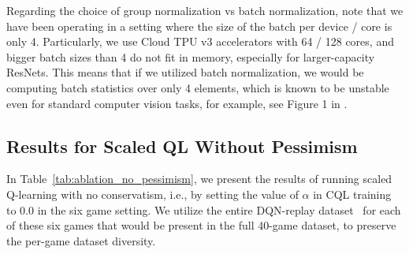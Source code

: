 \begin{table}[h]
    \centering
    \centering
    \vspace{-0.4cm}
    \caption{\footnotesize{{\textbf{Ablations for the backbone architecture in the 40-game setting} with ResNet 101. Observe that learned spatial embeddings leads to around 80\% improvement in performance.}}} %
    \label{tab:ablation_backbone_40_game}
    \vspace{0.25cm}
\end{table}

{Regarding the choice of group normalization vs batch normalization, note that we have been operating in a setting where the size of the batch per device / core is only 4. Particularly, we use Cloud TPU v3 accelerators with 64 / 128 cores, and bigger batch sizes than 4 do not fit in memory, especially for larger-capacity ResNets. This means that if we utilized batch normalization, we would be computing batch statistics over only 4 elements, which is known to be unstable even for standard computer vision tasks, for example, see Figure 1 in \citet{wu2018group}.} 

\vspace{-0.2cm}
\subsection{{{Results for Scaled QL Without Pessimism}}}
\label{app:no_pessimism}
\vspace{-0.2cm}
{In Table~\ref{tab:ablation_no_pessimism}, we present the results of running scaled Q-learning with no conservatism, i.e., by setting the value of $\alpha$ in CQL training to 0.0 in the six game setting. We utilize the entire DQN-replay dataset~\citep{agarwal2019optimistic} for each of these six games that would be present in the full 40-game dataset, to preserve the per-game dataset diversity.}

